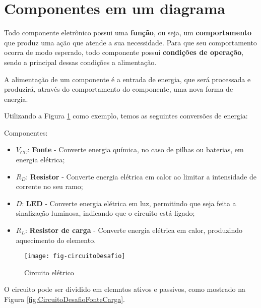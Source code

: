 \section{Componentes em um diagrama}

Todo componente eletrônico possui uma \textbf{função}, ou seja, um \textbf{comportamento} que produz uma ação que atende a sua necessidade. Para que seu comportamento ocorra de modo esperado, todo componente possui \textbf{condições de operação}, sendo a principal dessas condições a alimentação.

A alimentação de um componente é a entrada de energia, que será processada e produzirá, através do comportamento do componente, uma nova forma de energia.

Utilizando a Figura \ref{fig:CircuitoDesafioComponentes} como exemplo, temos as seguintes conversões de energia:

\begin{minipage}{\linewidth}
  \centering
  \begin{minipage}{0.45\linewidth}
    Componentes:
    \begin{itemize}
      \item $V_{CC}$: \textbf{Fonte} - Converte energia química, no caso de pilhas ou baterias, em energia elétrica;
      \item $R_D$: \textbf{Resistor} - Converte energia elétrica em calor ao limitar a intensidade de corrente no seu ramo;
      \item $D$: \textbf{LED} - Converte energia elétrica em luz, permitindo que seja feita a sinalização luminosa, indicando que o circuito está ligado;
      \item $R_L$: \textbf{Resistor de carga} - Converte energia elétrica em calor, produzindo aquecimento do elemento.
    \end{itemize}
  \end{minipage}
  \hspace{0.05\linewidth}
  \begin{minipage}{0.45\linewidth}
    \begin{figure}[H]
      \centering
      \caption{Circuito elétrico}
      \label{fig:CircuitoDesafioComponentes}
      \texttt{[image: fig-circuitoDesafio]}
%
    \end{figure}
  \end{minipage}
\end{minipage}


O circuito pode ser dividido em elemntos ativos e passivos, como mostrado na Figura \ref{fig:CircuitoDesafioFonteCarga}.

